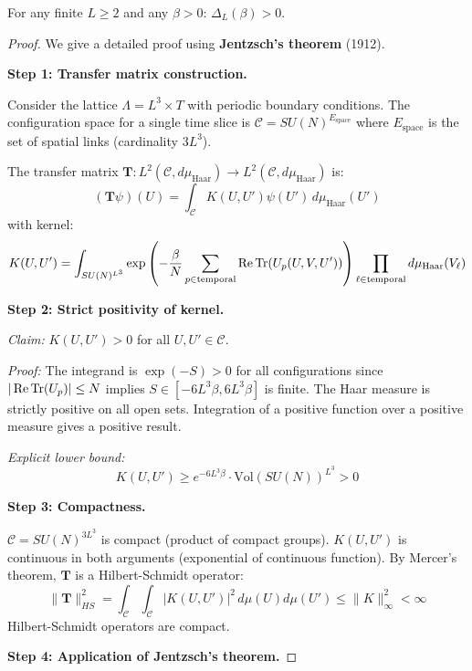 \begin{theorem}
\label{thm:finite-positive-complete}
\label{thm:bootstrap-rigorous}
For any finite $L \geq 2$ and any $\beta > 0$: $\Delta_L(\beta) > 0$.
\end{theorem}

\begin{proof}
We give a detailed proof using \textbf{Jentzsch's theorem} (1912).

\textbf{Step 1: Transfer matrix construction.}

Consider the lattice $\Lambda = L^3 \times T$ with periodic boundary conditions.
The configuration space for a single time slice is $\mathcal{C} = SU(N)^{E_{\text{space}}}$ 
where $E_{\text{space}}$ is the set of spatial links (cardinality $3L^3$).

The transfer matrix $\mathbf{T}: L^2(\mathcal{C}, d\mu_{\text{Haar}}) \to L^2(\mathcal{C}, d\mu_{\text{Haar}})$ is:
\[
(\mathbf{T}\psi)(U) = \int_{\mathcal{C}} K(U, U') \psi(U') \, d\mu_{\text{Haar}}(U')
\]
with kernel:
\[
K(U, U') = \int_{SU(N)^{L^3}} \exp\left(-\frac{\beta}{N} \sum_{p \in \text{temporal}} \operatorname{Re}\operatorname{Tr}(U_p(U, V, U'))\right) \prod_{\ell \in \text{temporal}} d\mu_{\text{Haar}}(V_\ell)
\]

\textbf{Step 2: Strict positivity of kernel.}

\textit{Claim:} $K(U, U') > 0$ for all $U, U' \in \mathcal{C}$.

\textit{Proof:} The integrand is $\exp(-S) > 0$ for all configurations since 
$|\operatorname{Re}\operatorname{Tr}(U_p)| \leq N$ implies $S \in [-6L^3\beta, 6L^3\beta]$ is finite.
The Haar measure is strictly positive on all open sets.
Integration of a positive function over a positive measure gives a positive result.

\textit{Explicit lower bound:} 
\[
K(U, U') \geq e^{-6L^3\beta} \cdot \text{Vol}(SU(N))^{L^3} > 0
\]

\textbf{Step 3: Compactness.}

$\mathcal{C} = SU(N)^{3L^3}$ is compact (product of compact groups).
$K(U, U')$ is continuous in both arguments (exponential of continuous function).
By Mercer's theorem, $\mathbf{T}$ is a Hilbert-Schmidt operator:
\[
\|\mathbf{T}\|_{HS}^2 = \int_{\mathcal{C}} \int_{\mathcal{C}} |K(U, U')|^2 \, d\mu(U) d\mu(U') 
\leq \|K\|_\infty^2 < \infty
\]
Hilbert-Schmidt operators are compact.

\textbf{Step 4: Application of Jentzsch's theorem.}


\end{proof}
